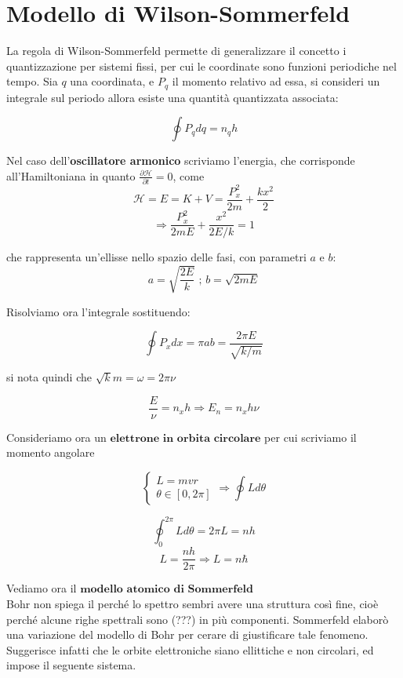 
\section{Modello di Wilson-Sommerfeld}

La regola di Wilson-Sommerfeld permette di generalizzare il concetto i quantizzazione per sistemi fissi, per cui le coordinate sono funzioni periodiche nel tempo.
Sia $q$ una coordinata, e $P_q$ il momento relativo ad essa, si consideri un integrale sul periodo allora esiste una quantità quantizzata associata:

$$ \oint P_q dq = n_q h $$

Nel caso dell'\textbf{oscillatore armonico} scriviamo l'energia, che corrisponde all'Hamiltoniana in quanto $\frac{\partial \mathcal{H}}{\partial t} = 0$, come 
$$ \mathcal{H} = E = K + V = \frac{P_x^2}{2m} + \frac{k x^2}{2} $$
$$\Rightarrow  \frac{P_x^2}{2mE} + \frac{x^2}{2 E/k} = 1$$

che rappresenta un'ellisse nello spazio delle fasi, con parametri $a$ e $b$:
$$a = \sqrt{\frac{2E}{k}} \mbox{  ;  }  b=\sqrt{2mE}$$

Risolviamo ora l'integrale sostituendo:

$$ \oint P_x dx = \pi a b = \frac{2\pi E}{\sqrt{k/m}} $$

si nota quindi che $\sqrt{k}{m} = \omega = 2\pi\nu$

$$ \frac{E}{\nu} = n_x h \Rightarrow  E_n = n_x h \nu$$

Consideriamo ora un $\textbf{elettrone in orbita circolare}$ per cui scriviamo il momento angolare

\begin{equation}
\begin{cases}
L = mvr \\
\theta \in [0, 2\pi]
\end{cases}
\Rightarrow \oint L d\theta
\end{equation}

$$ \oint_{0}^{2\pi} L d\theta = 2 \pi L = n h$$
$$ L = \frac{n h}{2 \pi} \Rightarrow L = n \hbar $$


Vediamo ora il $\textbf{modello atomico di Sommerfeld}$\\
Bohr non spiega il perché lo spettro sembri avere una struttura così fine, cioè perché alcune righe spettrali sono (???) in più componenti.
Sommerfeld elaborò una variazione del modello di Bohr per cerare di giustificare tale fenomeno.
Suggerisce infatti che le orbite elettroniche siano ellittiche e non circolari, ed impose il seguente sistema.

